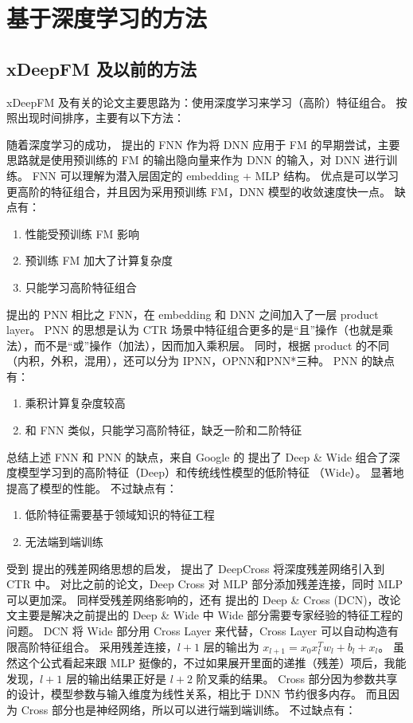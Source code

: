 \documentclass[degree=master,cjk-font=noto]{thuthesis}
\begin{document}
\section{基于深度学习的方法}

\subsection{xDeepFM 及以前的方法}

xDeepFM 及有关的论文主要思路为：使用深度学习来学习（高阶）特征组合。
按照出现时间排序，主要有以下方法：

随着深度学习的成功，\cite{fnn} 提出的 FNN 作为将 DNN 应用于 FM 的早期尝试，主要思路就是使用预训练的 FM 的输出隐向量来作为 DNN 的输入，对 DNN 进行训练。
FNN 可以理解为潜入层固定的 embedding + MLP 结构。
优点是可以学习更高阶的特征组合，并且因为采用预训练 FM，DNN 模型的收敛速度快一点。
缺点有：

\begin{enumerate}
  \item 性能受预训练 FM 影响
  \item 预训练 FM 加大了计算复杂度
  \item 只能学习高阶特征组合
\end{enumerate}

\cite{pnn} 提出的 PNN 相比之 FNN，在 embedding 和 DNN 之间加入了一层 product layer。
PNN 的思想是认为 CTR 场景中特征组合更多的是“且”操作（也就是乘法），而不是“或”操作（加法），因而加入乘积层。
同时，根据 product 的不同（内积，外积，混用），还可以分为 IPNN，OPNN和PNN*三种。
PNN 的缺点有：
\begin{enumerate}
  \item 乘积计算复杂度较高
  \item 和 FNN 类似，只能学习高阶特征，缺乏一阶和二阶特征
\end{enumerate}

总结上述 FNN 和 PNN 的缺点，来自 Google 的 \cite{deep_wide} 提出了 Deep \& Wide 组合了深度模型学习到的高阶特征（Deep）和传统线性模型的低阶特征 （Wide）。
显著地提高了模型的性能。
不过缺点有：

\begin{enumerate}
  \item 低阶特征需要基于领域知识的特征工程
  \item 无法端到端训练
\end{enumerate}

受到 \cite{resnet} 提出的残差网络思想的启发，\cite{deep_cross} 提出了 DeepCross 将深度残差网络引入到 CTR 中。
对比之前的论文，Deep Cross 对 MLP 部分添加残差连接，同时 MLP 可以更加深。
同样受残差网络影响的，还有 \cite{dcn} 提出的 Deep \& Cross (DCN)，改论文主要是解决之前提出的 Deep \& Wide 中 Wide 部分需要专家经验的特征工程的问题。
DCN 将 Wide 部分用 Cross Layer 来代替，Cross Layer 可以自动构造有限高阶特征组合。
采用残差连接，$l + 1$ 层的输出为 $x_{l+1} = x_0 x_l^T w_l + b_l + x_l$。
虽然这个公式看起来跟 MLP 挺像的，不过如果展开里面的递推（残差）项后，我能发现，$l + 1 $ 层的输出结果正好是 $l + 2$ 阶叉乘的结果。
Cross 部分因为参数共享的设计，模型参数与输入维度为线性关系，相比于 DNN 节约很多内存。
而且因为 Cross 部分也是神经网络，所以可以进行端到端训练。
不过缺点有：
\end{document}
